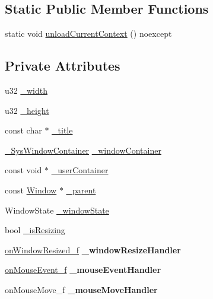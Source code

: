 \subsection*{Static Public Member Functions}
\begin{DoxyCompactItemize}
\item 
static void \mbox{\hyperlink{class_window_aa16f75d193a50d531da37508d3eb9606}{unload\+Current\+Context}} () noexcept
\end{DoxyCompactItemize}
\subsection*{Private Attributes}
\begin{DoxyCompactItemize}
\item 
u32 \mbox{\hyperlink{class_window_af019aa4d8f873000e1970f1e767bb5e4}{\+\_\+width}}
\item 
u32 \mbox{\hyperlink{class_window_aaa83baf1f913b498d57cc1ff58b872c0}{\+\_\+height}}
\item 
const char $\ast$ \mbox{\hyperlink{class_window_a452e9568dc406269180adbf31360ef74}{\+\_\+title}}
\item 
\mbox{\hyperlink{struct___sys_window_container}{\+\_\+\+Sys\+Window\+Container}} \mbox{\hyperlink{class_window_a1c6d0c1750d8bd3f6d34d966d53e4696}{\+\_\+window\+Container}}
\item 
const void $\ast$ \mbox{\hyperlink{class_window_a23e83496dec6b6ec76cb6a194d818796}{\+\_\+user\+Container}}
\item 
const \mbox{\hyperlink{class_window}{Window}} $\ast$ \mbox{\hyperlink{class_window_ae3b7f41531e0e9dc71e5b1e2381a6123}{\+\_\+parent}}
\item 
Window\+State \mbox{\hyperlink{class_window_a43c5622f0faf50873784dceb427e4e4f}{\+\_\+window\+State}}
\item 
bool \mbox{\hyperlink{class_window_a09e7ef3b8eadc8eb251447132997fc6b}{\+\_\+is\+Resizing}}
\item 
\mbox{\label{class_window_a991c23d5739e2d69121650485e9285f4}} 
\mbox{\hyperlink{_window_8hpp_a6849c0abbb7ea93481de9f39ddaf5c79}{on\+Window\+Resized\+\_\+f}} {\bfseries \+\_\+window\+Resize\+Handler}
\item 
\mbox{\label{class_window_a74374a7848ad07fc35f833c0279e3b46}} 
\mbox{\hyperlink{_window_8hpp_ad1980bd4a8619653dab87e3d48f94780}{on\+Mouse\+Event\+\_\+f}} {\bfseries \+\_\+mouse\+Event\+Handler}
\item 
\mbox{\label{class_window_a5105786903589e50010dfdf8d98a3c9d}} 
on\+Mouse\+Move\+\_\+f {\bfseries \+\_\+mouse\+Move\+Handler}
\end{DoxyCompactItemize}
